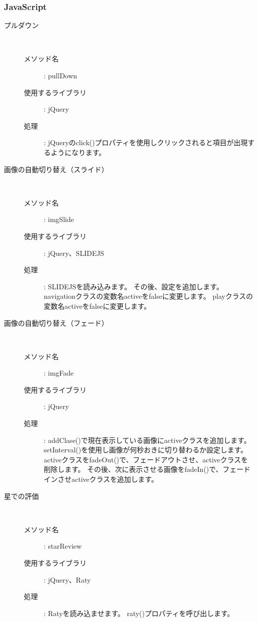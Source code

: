 \documentclass[a4j,titlepage]{jarticle}
\begin{document}
\subsubsection{JavaScript}
\begin{description}
\item [プルダウン]~
  \begin{description}
    \item [メソッド名] : pullDown
    \item [使用するライブラリ] : jQuery
    \item [処理] : jQueryのclick()プロパティを使用しクリックされると項目が出現するようになります。
  \end{description}

\item [画像の自動切り替え（スライド）]~
  \begin{description}
    \item [メソッド名] : imgSlide
    \item [使用するライブラリ] : jQuery、SLIDEJS
    \item [処理] : SLIDEJSを読み込みます。
    その後、設定を追加します。
    navigationクラスの変数名activeをfalseに変更します。
    playクラスの変数名activeをfalseに変更します。
  \end{description}

\item[画像の自動切り替え（フェード）]~
  \begin{description}
    \item [メソッド名] : imgFade
    \item [使用するライブラリ] : jQuery
    \item [処理] : addClase()で現在表示している画像にactiveクラスを追加します。
    setInterval()を使用し画像が何秒おきに切り替わるか設定します。
    activeクラスをfadeOut()で、フェードアウトさせ、activeクラスを削除します。
    その後、次に表示させる画像をfadeIn()で、フェードインさせactiveクラスを追加します。
  \end{description}

\item[星での評価]~
  \begin{description}
    \item [メソッド名] : starReview
    \item [使用するライブラリ] : jQuery、Raty
    \item [処理] : Ratyを読み込ませます。
    raty()プロパティを呼び出します。
  \end{description}


\end{description}
\end{document}
